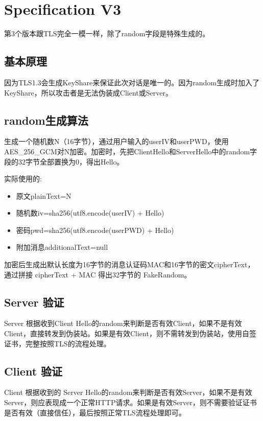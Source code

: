 \chapter{Specification V3}
第3个版本跟TLS完全一模一样，除了random字段是特殊生成的。

\section{基本原理}
因为TLS1.3会生成KeyShare来保证此次对话是唯一的。因为random生成时加入了KeyShare，所以攻击者是无法伪装成Client或Server。

\section{random生成算法}
生成一个随机数N（16字节），通过用户输入的userIV和userPWD，使用AES\_256\_GCM对N加密。加密时，先把ClientHello和ServerHello中的random字段的32字节全部置换为0，得出Hello。

实际使用的:
\begin{itemize}
	\item 原文plainText=N
	\item 随机数iv=sha256(utf8.encode(userIV) + Hello)
	\item 密码pwd=sha256(utf8.encode(userPWD) + Hello)
	\item 附加消息additionalText=null
\end{itemize}

加密后生成出默认长度为16字节的消息认证码MAC和16字节的密文cipherText，通过拼接 cipherText + MAC 得出32字节的 FakeRandom。

\section{Server 验证}
Server 根据收到Client Hello的random来判断是否有效Client，如果不是有效Client，直接转发到伪装站。如果是有效Client，则不需转发到伪装站，使用自签证书，完整按照TLS的流程处理。

\section{Client 验证}
Client 根据收到的 Server Hello的random来判断是否有效Server，如果不是有效Server，则应表现成一个正常HTTP请求。如果是有效Server，则不需要验证证书是否有效（直接信任），最后按照正常TLS流程处理即可。
